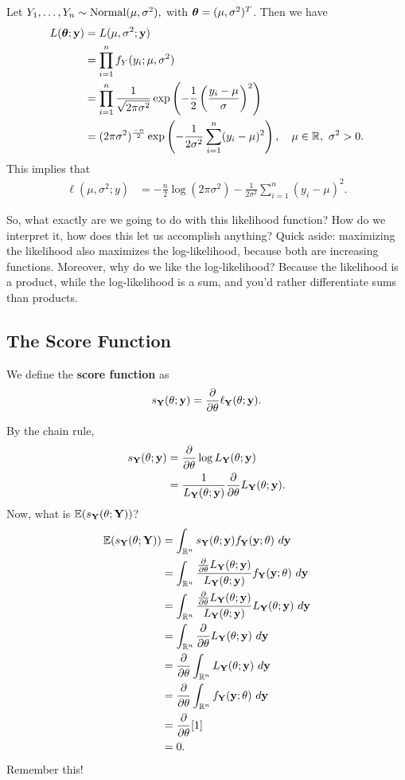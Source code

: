 \begin{eg}
Let $Y_1,\ldots, Y_n\sim \operatorname*{Normal}(\mu,\sigma^2),$ with ${\boldsymbol{\theta}}=(\mu,\sigma^2)^T$. Then we have
\begin{align*}
    L({\boldsymbol{\theta}}; \mathbf y)&=L(\mu,\sigma^2;\mathbf y) \\
    &=\prod^n_{i=1} f_Y(y_i;\mu,\sigma^2) \\
    &=\prod^n_{i=1} \frac{1}{\sqrt{2\pi \sigma^2}} \exp\left(-\frac{1}{2}\left(\frac{y_i-\mu}{\sigma}\right)^2\right) \\
    &=(2\pi\sigma^2)^{\frac{-n}{2}}\exp\left(-\frac{1}{2\sigma^2}\sum^n_{i=1}(y_i-\mu)^2\right), \quad \mu\in \mathbb R, \ \sigma^2>0. 
\end{align*}
This implies that 
\begin{align*}
   \ell(\mu,\sigma^2;y)&=-\frac{n}{2}\log(2\pi \sigma^2)-\frac{1}{2\sigma^2}\sum^n_{i=1}(y_i-\mu)^2.
\end{align*}
\end{eg}
\begin{remark}
So, what exactly are we going to do with this likelihood function? How do we interpret it, how does this let us accomplish anything? Quick aside: maximizing the likelihood also maximizes the log-likelihood, because both are increasing functions. Moreover, why do we like the log-likelihood? Because the likelihood is a product, while the log-likelihood is a sum, and you'd rather differentiate sums than products.
\end{remark}

\subsection{The Score Function}
\begin{definition}
We define the \textbf{score function} as
$$
s_{\mathbf Y}(\theta;\mathbf y)=\frac{\partial}{\partial\theta}\ell_\mathbf Y(\theta;\mathbf y).
$$
\end{definition}
By the chain rule,
\begin{align*}
    s_\mathbf Y(\theta;\mathbf y)&=\frac{\partial}{\partial\theta}\log L_\mathbf Y(\theta;\mathbf y)\\
    &=\frac{1}{L_\mathbf Y(\theta;\mathbf y)}\frac{\partial}{\partial\theta}{L_\mathbf Y(\theta;\mathbf y)}.
\end{align*}
Now, what is $\mathbb E(s_\mathbf Y(\theta;\mathbf Y))$?
\begin{align*}
    \mathbb E(s_\mathbf Y(\theta;\mathbf Y))
    &=\int_{\mathbb R^n} s_\mathbf Y(\theta;\mathbf y) f_\mathbf Y(\mathbf y;\theta) \ d\mathbf y\\
    &=\int_{\mathbb R^n} \frac{\frac{\partial}{\partial\theta}L_\mathbf Y(\theta;\mathbf y)}{L_\mathbf Y(\theta;\mathbf y)}f_\mathbf Y(\mathbf y;\theta) \ d\mathbf y\\
    &=\int_{\mathbb R^n} \frac{\frac{\partial}{\partial\theta}L_\mathbf Y(\theta;\mathbf y)}{L_\mathbf Y(\theta;\mathbf y)}L_\mathbf Y(\theta;\mathbf y) \ d\mathbf y \\
    &=\int_{\mathbb R^n} \frac{\partial}{\partial\theta}{L_\mathbf Y(\theta;\mathbf y)}\ d\mathbf y \\
    &=\frac{\partial}{\partial\theta}\int_{\mathbb R^n}L_{\mathbf Y}(\theta;\mathbf y)\ d\mathbf y \\
    &=\frac{\partial}{\partial\theta}\int_{\mathbb R^n}f_{\mathbf Y}(\mathbf y;\theta)\ d\mathbf y \\
    &=\frac{\partial}{\partial\theta}[1]\\
    &=0.
\end{align*}
Remember this!

